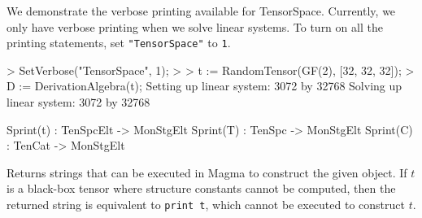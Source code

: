 \documentclass{documentation}
\begin{document}
\begin{example}[VerbosePrinting]
We demonstrate the verbose printing available for TensorSpace. 
Currently, we only have verbose printing when we solve linear systems. 
To turn on all the printing statements, set \texttt{"TensorSpace"} to {\tt 1}. 

\begin{code}
> SetVerbose("TensorSpace", 1);
> 
> t := RandomTensor(GF(2), [32, 32, 32]);
> D := DerivationAlgebra(t);
Setting up linear system: 3072 by 32768
Solving up linear system: 3072 by 32768
\end{code}
\end{example}

\begin{intrinsics}
Sprint(t) : TenSpcElt -> MonStgElt
Sprint(T) : TenSpc -> MonStgElt
Sprint(C) : TenCat -> MonStgElt
\end{intrinsics}

Returns strings that can be executed in Magma to construct the given object. If
$t$ is a black-box tensor where structure constants cannot be computed, then the
returned string is equivalent to \texttt{print t}, which cannot be executed to
construct $t$. 
\end{document}
